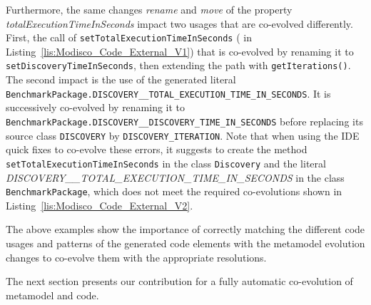 Furthermore, the same changes \textit{rename} and \textit{move} of the property \emph{totalExecutionTimeInSeconds} impact two usages that are co-evolved differently. First, the call of \texttt{setTotalExecutionTimeInSeconds} ({\small{}} in Listing~\ref{lis:Modisco_Code_External_V1}) that is co-evolved by renaming it to \texttt{setDiscoveryTimeInSeconds}, then extending the path with \texttt{getIterations()}. The second impact is the use of the generated literal %
\texttt{\footnotesize{BenchmarkPackage.DISCOVERY\_\_TOTAL\_EXECUTION\_TIME\_IN\_SECONDS}}. It is successively co-evolved by renaming it to \texttt{\footnotesize{BenchmarkPackage.DISCOVERY\_\_DISCOVERY\_TIME\_IN\_SECONDS}} before replacing its source class \texttt{DISCOVERY} by \texttt{DISCOVERY\_ITERATION}. 
Note that when using the IDE quick fixes to co-evolve these errors, it suggests to create the method \texttt{setTotalExecutionTimeInSeconds} in the class \texttt{Discovery} and the literal \emph{\footnotesize{DISCOVERY\_\_TOTAL\_EXECUTION\_TIME\_IN\_SECONDS}} in the class \texttt{BenchmarkPackage}, which does not meet the required co-evolutions shown in Listing~\ref{lis:Modisco_Code_External_V2}.

The above examples show the importance of correctly matching the different code usages and patterns of the generated code elements with the metamodel evolution changes to co-evolve them with the appropriate resolutions. 

The next section presents our contribution for a fully automatic co-evolution of metamodel and code.  


